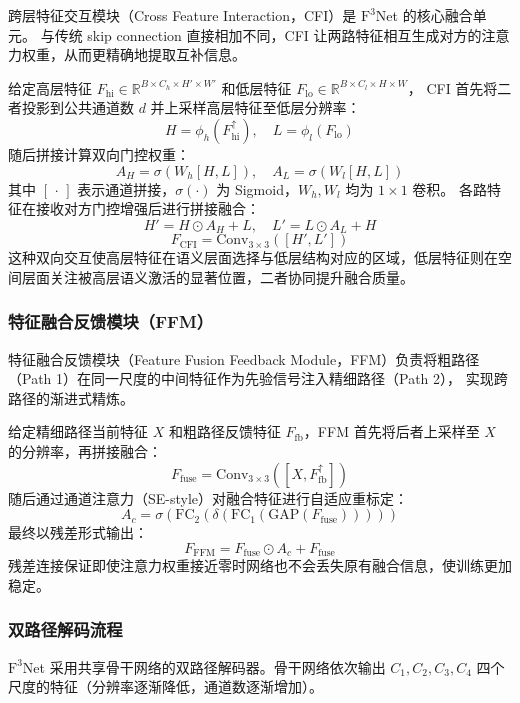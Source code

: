 \documentclass[UTF8,a4paper,10pt]{ctexart}
\begin{document}
跨层特征交互模块（Cross Feature Interaction，CFI）是 $\text{F}^3$Net 的核心融合单元。
与传统 skip connection 直接相加不同，CFI 让两路特征相互生成对方的注意力权重，从而更精确地提取互补信息。

给定高层特征 $F_{\text{hi}} \in \mathbb{R}^{B \times C_h \times H' \times W'}$ 和低层特征 $F_{\text{lo}} \in \mathbb{R}^{B \times C_l \times H \times W}$，
CFI 首先将二者投影到公共通道数 $d$ 并上采样高层特征至低层分辨率：
\[
H = \phi_h(F_{\text{hi}}^{\uparrow}), \quad L = \phi_l(F_{\text{lo}})
\]
随后拼接计算双向门控权重：
\[
A_H = \sigma\!\left(W_h[H, L]\right), \quad A_L = \sigma\!\left(W_l[H, L]\right)
\]
其中 $[\,\cdot\,]$ 表示通道拼接，$\sigma(\cdot)$ 为 Sigmoid，$W_h, W_l$ 均为 $1\times1$ 卷积。
各路特征在接收对方门控增强后进行拼接融合：
\[
H' = H \odot A_H + L, \quad L' = L \odot A_L + H
\]
\[
F_{\text{CFI}} = \text{Conv}_{3\times3}([H', L'])
\]
这种双向交互使高层特征在语义层面选择与低层结构对应的区域，低层特征则在空间层面关注被高层语义激活的显著位置，二者协同提升融合质量。

\subsubsection{特征融合反馈模块（FFM）}

特征融合反馈模块（Feature Fusion Feedback Module，FFM）负责将粗路径（Path 1）在同一尺度的中间特征作为先验信号注入精细路径（Path 2），
实现跨路径的渐进式精炼。

给定精细路径当前特征 $X$ 和粗路径反馈特征 $F_{\text{fb}}$，FFM 首先将后者上采样至 $X$ 的分辨率，再拼接融合：
\[
F_{\text{fuse}} = \text{Conv}_{3\times3}([X, F_{\text{fb}}^{\uparrow}])
\]
随后通过通道注意力（SE-style）对融合特征进行自适应重标定：
\[
A_c = \sigma\!\left(\text{FC}_2\!\left(\delta\!\left(\text{FC}_1\!\left(\text{GAP}(F_{\text{fuse}})\right)\right)\right)\right)
\]
最终以残差形式输出：
\[
F_{\text{FFM}} = F_{\text{fuse}} \odot A_c + F_{\text{fuse}}
\]
残差连接保证即使注意力权重接近零时网络也不会丢失原有融合信息，使训练更加稳定。

\subsubsection{双路径解码流程}

$\text{F}^3$Net 采用共享骨干网络的双路径解码器。骨干网络依次输出 $C_1, C_2, C_3, C_4$ 四个尺度的特征（分辨率逐渐降低，通道数逐渐增加）。
\end{document}
